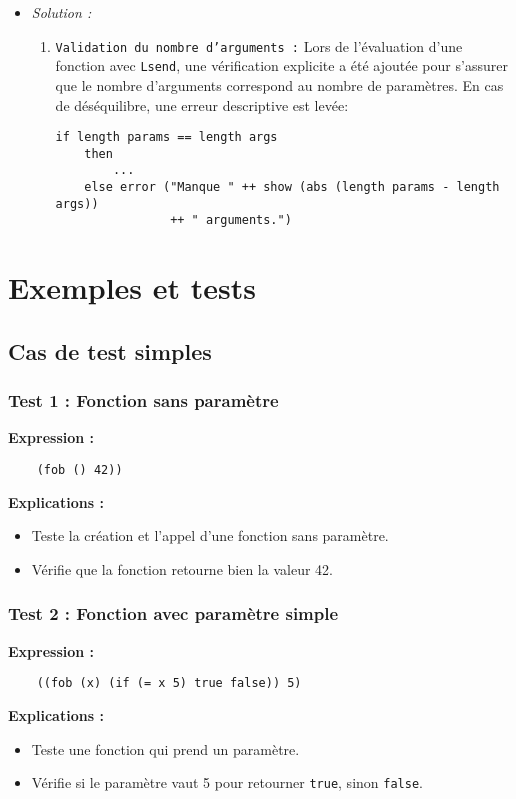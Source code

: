 \documentclass{article}
\begin{document}
\begin{enumerate}
\begin{itemize}
            \item \textit{Solution :} 
                \begin{enumerate}
                    \item \texttt{Validation du nombre d'arguments :} Lors de l’évaluation d’une fonction avec \texttt{Lsend}, une 
                                  vérification explicite a été ajoutée pour s'assurer que le nombre d'arguments correspond au nombre 
                                  de paramètres. En cas de déséquilibre, une erreur descriptive est levée:\newline
                    \begin{lstlisting}
if length params == length args
    then 
        ...
    else error ("Manque " ++ show (abs (length params - length args)) 
                ++ " arguments.")
                    \end{lstlisting}
                \end{enumerate}
        \end{itemize}
\end{enumerate}

\newpage 
\section{Exemples et tests} 
\subsection{Cas de test simples} 
\subsubsection*{Test 1 : Fonction sans paramètre} 
\hspace{.5cm}\textbf{Expression :} 
\begin{verbatim} 
    (fob () 42)) 
\end{verbatim} 
\hspace{.5cm}\textbf{Explications :} 
\begin{itemize} 
    \item Teste la création et l'appel d'une fonction sans paramètre. 
    \item Vérifie que la fonction retourne bien la valeur 42. 
\end{itemize}
\subsubsection*{Test 2 : Fonction avec paramètre simple} 
\hspace{.5cm}\textbf{Expression :} 
\begin{verbatim} 
    ((fob (x) (if (= x 5) true false)) 5) 
\end{verbatim} 
\hspace{.5cm}\textbf{Explications :} 
\begin{itemize} 
    \item Teste une fonction qui prend un paramètre. 
    \item Vérifie si le paramètre vaut 5 pour retourner \texttt{true}, sinon \texttt{false}. 
\end{itemize}
\end{document}
